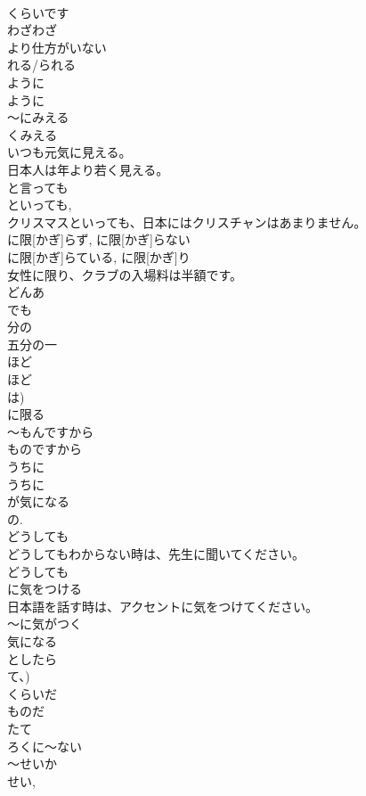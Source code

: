 \documentclass[8pt]{extreport}
\begin{document}
\begin{CJK}{UTF8}{min}
\\	くらいです	
\\	わざわざ~	
\\	より仕方がいない	
\\	れる/られる	
\\	ように 
\\	ように 
\\	～にみえる 
\\	くみえる	
\\	いつも元気に見える。
\\	日本人は年より若く見える。
\\	と言っても
\\	といっても, 
\\	クリスマスといっても、日本にはクリスチャンはあまりません。
\\	に限[かぎ]らず, に限[かぎ]らない	
\\	に限[かぎ]らている, に限[かぎ]り	
\\	女性に限り、クラブの入場料は半額です。
\\	どんあ
\\	でも	
\\	分の 
\\	五分の一 
\\	ほど	
\\	ほど 
\\	は)
\\	に限る	
\\	～もんですから 
\\	ものですから	
\\	うちに	
\\	うちに	
\\	が気になる	
\\	の.  
\\	どうしても 
\\	どうしてもわからない時は、先生に聞いてください。
\\	どうしても 
\\	に気をつける	
\\	日本語を話す時は、アクセントに気をつけてください。
\\	～に気がつく	
\\	気になる	
\\	としたら	
\\	て、)
\\	くらいだ	
\\	ものだ	
\\	たて	
\\	ろくに～ない	
\\	～せいか	
\\	せい, 

\end{CJK}
\end{document}
